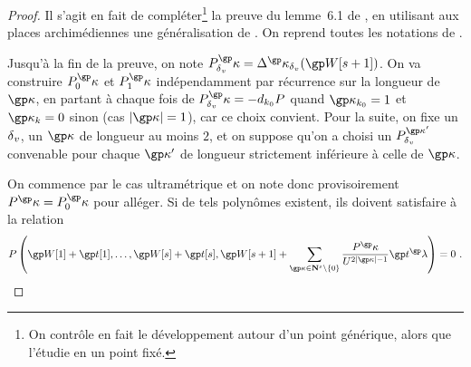 \begin{proof}
  Il s'agit en fait de compléter\footnote{On contrôle en fait le développement
    autour d'un point générique, alors que  l'étudie en un point
    fixé.} la preuve du lemme~6.1 de \cite{remivds}, en
  utilisant aux places archimédiennes une généralisation de
  \cite[relation~2.3.1, p.~63]{farhith}. On reprend toutes les notations de
  \cite{remivds}.

  Jusqu'à la fin de la preuve, on note \( P_\dv^\expp = \pmnum^\expp_\dv
    (\anyvp[\anydim+1]) \).  On va construire $P_0^\expp$ et $P_1^\expp$
  indépendamment par récurrence
  sur la longueur de $\expp$, en partant à chaque fois de $P_\dv^\expp = -
  d_{\ind_0}P$ quand $\expp_{\ind_0} = 1$ et $\expp_\ind = 0$ sinon (cas
  $\lgr\expp = 1$), car ce choix convient. Pour la suite, on fixe un ${\delta\smash{_v}}$, un
  $\expp$ de longueur au moins $2$, et on suppose qu'on a choisi un
  $P_\dv^{\expp'}$ convenable pour chaque $\expp'$ de longueur strictement
  inférieure à celle de $\expp$.

  On commence par le cas ultramétrique et on note donc provisoirement $P^\expp
  = P_0^\expp$ pour alléger. Si de tels polynômes existent, ils doivent
  satisfaire à la relation
  \begin{equation}
    P \left(
      \anyvp[1] + \psp[1], \dots, \anyvp[\anydim] + \psp[\anydim],
      \anyvp[\anydim+1] + \sum_{\expp \in \N^\anydim \setminus \{0\}}
      \frac {P^\expp} {\pden^{2\lgr\expp -1}} \psp^\ip
    \right) = 0 \pmm.
  \end{equation}
\end{proof}

\endinput

